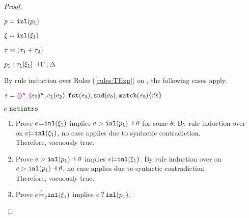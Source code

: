 \begin{proof}
\begin{byCases}
    \begin{pfsteps*}
    \item $p=\mathtt{inl}(p_1)$ 
    \item $\xi=\mathtt{inl}(\xi_1)$ 
    \item $\tau=\tsum{\tau_1}{\tau_2}$ 
    \item $\chpattyp{p_1}{\tau_1}{\xi_1}{\Gamma}{\Delta}$  
    \end{pfsteps*}
    By rule induction over Rules (\ref{rules:TExp}) on , the following cases apply.
    \begin{byCases}
    \item[\text{(\ref{rule:TEHole}),(\ref{rule:THole}),(\ref{rule:TAp}),(\ref{rule:TFst}),(\ref{rule:TSnd}),(\ref{rule:TMatchZPre}),(\ref{rule:TMatchNZPre})}]
        \begin{pfsteps*}
        \item $e=\textcolor{violet}{\llparenthesis}\textcolor{violet}{\rrparenthesis}^{u},\textcolor{violet}{\llparenthesis} e_0\textcolor{violet}{\rrparenthesis}^{u},e_1(e_2),\mathtt{fst}(e_0),\mathtt{snd}(e_0),\mathtt{match}(e_0) \{\hat{rs}\}$ 
        \item $e ~\mathtt{notintro}$  
        \end{pfsteps*}
        \begin{enumerate}
        \item Prove $e \dot{\models} \mathtt{inl}(\xi_1)$ implies $\hpatmatch{e}{\hinlp{p_1}}{\theta}$ for some $\theta$.
        By rule induction over  on $e \dot{\models} \mathtt{inl}(\xi_1)$, no case applies due to syntactic contradiction. \\ Therefore, vacuously true.
        \item Prove $\hpatmatch{e}{\hinlp{p_1}}{\theta}$ implies $e \dot{\models} \mathtt{inl}(\xi_1)$.
        By rule induction over  on $\hpatmatch{e}{\hinlp{p_1}}{\theta}$, no case applies due to syntactic contradiction. \\ Therefore, vacuously true.
        \item Prove $e \dot{\models}_{?} \mathtt{inl}(\xi_1)$ implies $e \mathbin{?} \mathtt{inl}(p_1)$.
\end{enumerate}
\end{byCases}
\end{byCases}
\end{proof}
